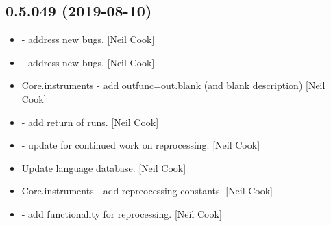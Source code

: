 \documentclass[a4paper,10pt,english]{report}
\begin{document}
\subsection{0.5.049 (2019-08-10)}
\label{\detokenize{misc/changelog:id93}}\begin{itemize}
\item {} 
 - address new bugs. {[}Neil Cook{]}

\item {} 
 - address new bugs. {[}Neil Cook{]}

\item {} 
Core.instruments - add outfunc=out.blank (and blank description) {[}Neil
Cook{]}

\item {} 
 - add return of runs. {[}Neil Cook{]}

\item {} 
 - update for continued work on reprocessing. {[}Neil
Cook{]}

\item {} 
Update language database. {[}Neil Cook{]}

\item {} 
Core.instruments - add repreocessing constants. {[}Neil Cook{]}

\item {} 
 - add functionality for reprocessing. {[}Neil Cook{]}

\end{itemize}
\end{document}
